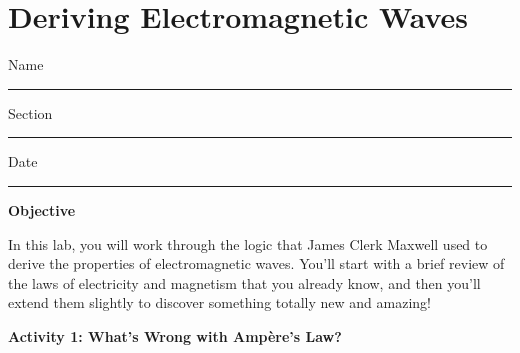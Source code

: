 \section{Deriving Electromagnetic Waves}

Name \rule{2.0in}{0.1pt}\hfill{}Section \rule{1.0in}{0.1pt}\hfill{}Date
\rule{1.0in}{0.1pt}

\vspace{0.1in}
\textbf{Objective} 

In this lab, you will work through the logic that James Clerk Maxwell used to derive the properties of electromagnetic waves.  You'll start with a brief review of the laws of electricity and magnetism that you already know, and then you'll extend them slightly to discover something totally new and amazing!

\textbf{Activity 1: What's Wrong with Amp\`ere's Law?}

